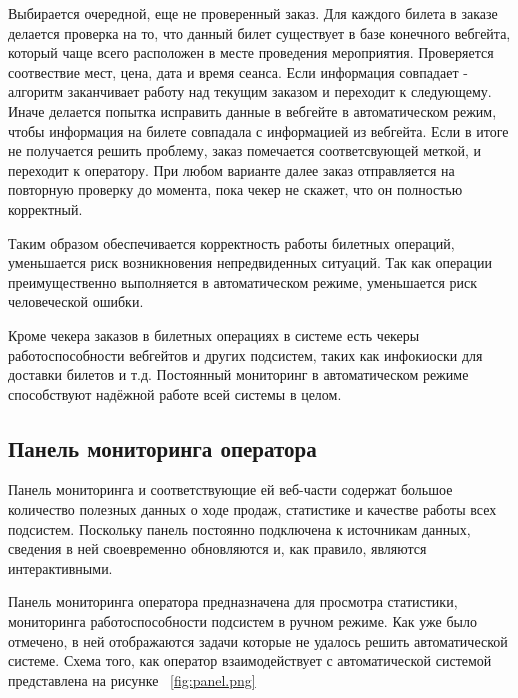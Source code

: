 Выбирается очередной, еще не проверенный заказ. Для каждого билета в заказе делается проверка на то, что данный билет существует в базе конечного вебгейта, который чаще всего расположен в месте проведения мероприятия. Проверяется соотвествие мест, цена, дата и время сеанса. Если информация совпадает - алгоритм заканчивает работу над текущим заказом и переходит к следующему. Иначе делается попытка исправить данные в вебгейте в автоматическом режим, чтобы информация на билете совпадала с информацией из вебгейта. Если в итоге не получается решить проблему, заказ помечается соответсвующей меткой, и переходит к оператору. При любом варианте далее заказ отправляется на повторную проверку до момента, пока чекер не скажет, что он полностью корректный.

Таким образом обеспечивается корректность работы билетных операций, уменьшается риск возникновения непредвиденных ситуаций. Так как операции преимущественно выполняется в автоматическом режиме, уменьшается риск человеческой ошибки. 


Кроме чекера заказов в билетных операциях в системе есть чекеры работоспособности вебгейтов и других подсистем, таких как инфокиоски для доставки билетов и т.д.
Постоянный мониторинг в автоматическом режиме способствуют надёжной работе всей системы в целом.


\subsection{Панель мониторинга оператора}


Панель мониторинга и соответствующие ей веб-части содержат большое количество полезных данных о ходе продаж, статистике и качестве работы всех подсистем. Поскольку панель  постоянно подключена к источникам данных, сведения в ней своевременно обновляются и, как правило, являются интерактивными.

Панель мониторинга оператора предназначена для просмотра статистики, мониторинга работоспособности подсистем в ручном режиме. Как уже было отмечено, в ней отображаются  задачи которые не удалось решить автоматической системе. Схема того, как оператор взаимодействует с автоматической системой представлена на рисунке ~\ref{fig:panel.png}

